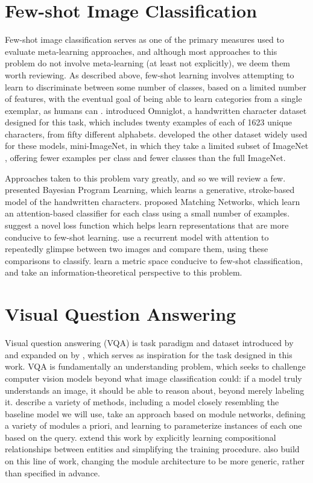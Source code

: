 \section{Few-shot Image Classification}
Few-shot image classification serves as one of the primary measures used to evaluate meta-learning approaches, and although most approaches to this problem do not involve meta-learning (at least not explicitly), we deem them worth reviewing. As described above, few-shot learning involves attempting to learn to discriminate between some number of classes, based on a limited number of features, with the eventual goal of being able to learn categories from a single exemplar, as humans can \parencite{Lake2015}. \textcite{Lake2015,Lake2019} introduced Omniglot, a handwritten character dataset designed for this task, which includes twenty examples of each of 1623 unique characters, from fifty different alphabets. \textcite{Vinyals2016} developed the other dataset widely used for these models, mini-ImageNet, in which they take a limited subset of ImageNet \parencite{Deng2009}, offering fewer examples per class and fewer classes than the full ImageNet. 

Approaches taken to this problem vary greatly, and so we will review a few. \textcite{Lake2015} presented Bayesian Program Learning, which learns a generative, stroke-based model of the handwritten characters. \textcite{Vinyals2016} proposed Matching Networks, which learn an attention-based classifier for each class using a small number of examples. \textcite{Hariharan2016} suggest a novel loss function which helps learn representations that are more conducive to few-shot learning. \textcite{Shyam2017} use a recurrent model with attention to repeatedly glimpse between two images and compare them, using these comparisons to classify. \textcite{Snell2017} learn a metric space conducive to few-shot classification, and \textcite{Triantafillou2017} take an information-theoretical perspective to this problem. 

\section{Visual Question Answering}
Visual question answering (VQA) is task paradigm and dataset introduced by \textcite{Antol2015} and expanded on by \textcite{Agrawal2016}, which serves as inspiration for the task designed in this work. VQA is fundamentally an understanding problem, which seeks to challenge computer vision models beyond what image classification could: if a model truly understands an image, it should be able to reason about, beyond merely labeling it.  \textcite{Agrawal2016} describe a variety of methods, including a model closely resembling the baseline model we will use, \textcite{Andreas2015,Andreas2016} take an approach based on module networks, defining a variety of modules a priori, and learning to parameterize instances of each one based on the query. \textcite{Hu2016,Hu2017} extend this work by explicitly learning compositional relationships between entities and simplifying the training procedure. \textcite{Johnson} also build on this line of work, changing the module architecture to be more generic, rather than specified in advance. 

